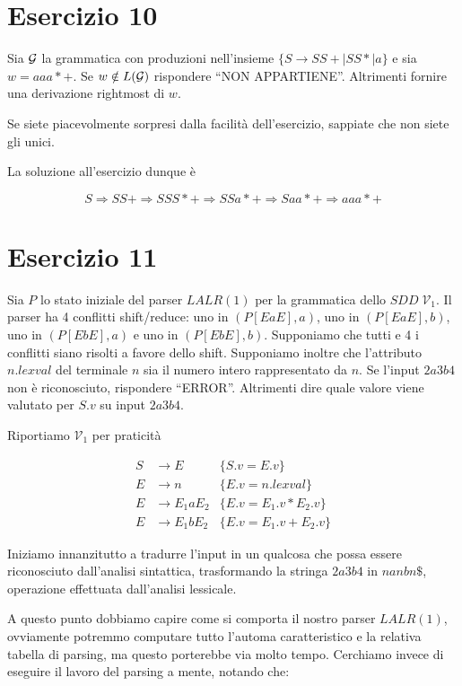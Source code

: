 \documentclass[class=book, crop=false, oneside, 12pt]{standalone}
\begin{document}
\section*{Esercizio 10}

Sia \(\mathcal{G}\) la grammatica con produzioni nell'insieme \(\{S \to SS+ \mid SS* \mid a\}\) e sia \(w=aaa*+\).  Se \(w \notin L(\mathcal{G})\) rispondere “NON APPARTIENE”. Altrimenti fornire una derivazione rightmost di \(w\).

Se siete piacevolmente sorpresi dalla facilità dell'esercizio, sappiate che non siete gli unici. 

La soluzione all'esercizio dunque è

\begin{equation}
    S \Rightarrow SS+ \Rightarrow S SS* + \Rightarrow  SSa*+ \Rightarrow  Saa*+ \Rightarrow  aaa*+
\end{equation}

\section*{Esercizio 11}

Sia \(P\) lo  stato  iniziale  del  parser  \(LALR(1)\)  per  la  grammatica  dello  \(SDD \; \mathcal{V}_1\). Il parser ha 4  conflitti shift/reduce:  uno in \((P[EaE],a)\), uno in \((P[EaE],b)\), uno in \((P[EbE],a)\) e uno in \((P[EbE],b)\).  Supponiamo  che  tutti  e  4  i  conflitti  siano  risolti  a  favore  dello  shift.   Supponiamo  inoltre  che  l’attributo \(n.lexval\) del terminale \(n\) sia il numero intero rappresentato da \(n\).  Se l'input \(2a3b4\) non è riconosciuto, rispondere “ERROR”. Altrimenti dire quale valore viene valutato per \(S.v\) su input \(2a3b4\).

Riportiamo \(\mathcal{V}_1\) per praticità

\begin{align*}
    S &\to E &\{S.v = E.v\} \\
    E &\to n &\{E.v = n.lexval\} \\
    E &\to E_1 a E_2 &\{E.v = E_1.v * E_2.v\} \\
    E &\to E_1 b E_2 &\{E.v = E_1.v + E_2.v\} 
\end{align*}

Iniziamo innanzitutto a tradurre l'input in un qualcosa che possa essere riconosciuto dall'analisi sintattica, trasformando la stringa \(2a3b4\) in \(nanbn\$\), operazione effettuata dall'analisi lessicale.

A questo punto dobbiamo capire come si comporta il nostro parser \(LALR(1)\), ovviamente potremmo computare tutto l'automa caratteristico e la relativa tabella di parsing, ma questo porterebbe via molto tempo. Cerchiamo invece di eseguire il lavoro del parsing a mente, notando che:
\end{document}
